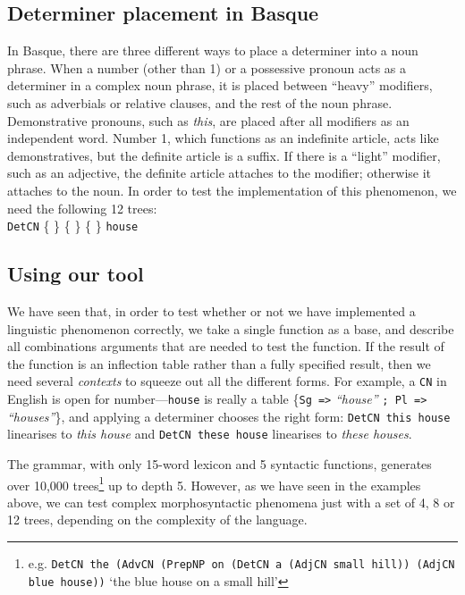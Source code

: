 \documentclass[11pt]{article}
\def\t#1{\texttt{#1}}
\newcommand{\tts}[1]{{\tt #1}}
\begin{document}
\subsection{Determiner placement in Basque} In Basque, there are three
different ways to place a determiner into a noun phrase. When a number
(other than 1) or a possessive pronoun acts as a determiner in a
complex noun phrase, it is placed between ``heavy'' modifiers, such as
adverbials or relative clauses, and the rest of the noun
phrase. Demonstrative pronouns, such as \emph{this}, are placed after
all modifiers as an independent word. Number 1, which functions as an
indefinite article, acts like demonstratives, but the definite article
is a suffix. If there is a ``light'' modifier, such as an adjective,
the definite article attaches to the modifier; otherwise it attaches
to the noun. In order to test the implementation of this phenomenon,
we need the following 12 trees:  \\ 
\t{DetCN} \{
\stackanchor{\stackanchor{}{\tts{the}}}{\stackanchor{\tts{this}}{\tts{your}}}
\} \{  \} 
\{  \}  {\tt house} 


\subsection{Using our tool} We have seen that, in order to test whether or not we have implemented a linguistic phenomenon correctly, we take a single function as a base, and describe all combinations arguments that are
needed to test the function. If the result of the function is an
inflection table rather than a fully specified result, then we need
several \emph{contexts} to squeeze out all the different forms.
For example, a \t{CN} in English is open for number---\t{house} is
really a table \{\t{Sg =>} \emph{``house''} \t{; Pl =>} \emph{``houses''}\}, and
applying a determiner chooses the right form: \t{DetCN this house}
linearises to \emph{this house} and \t{DetCN these house} linearises
to \emph{these houses}. 

\label{sec:wishlist_comments}
The grammar, with only 15-word lexicon and 5 syntactic functions,
generates over 10,000 %
trees\footnote{e.g. {\tt DetCN the (AdvCN (PrepNP on
(DetCN a (AdjCN small hill)) (AdjCN blue house))} `the blue house on a
small hill'}  up to depth 5. 
However, as we have seen in the examples above, we can test complex morphosyntactic phenomena just with a set
of 4, 8 or 12 trees, depending on the complexity of the language.
\end{document}
